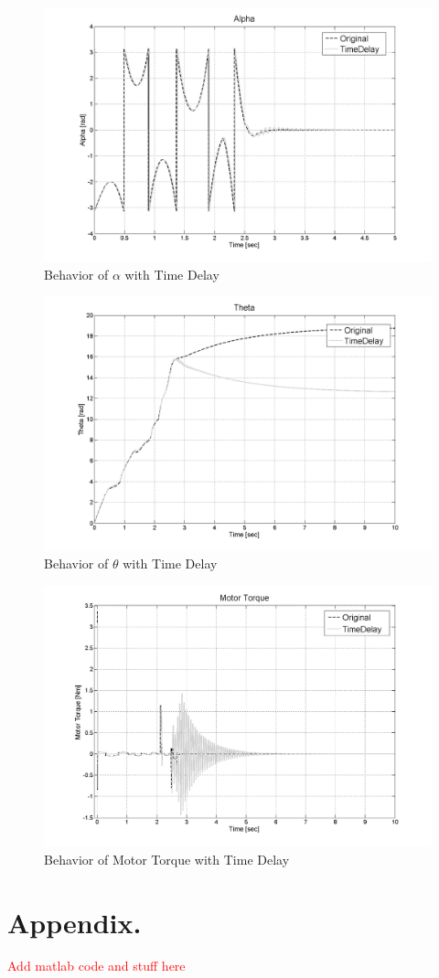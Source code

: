 \documentclass{article}
\newcommand{\xxx}[1]{\textcolor{red}{#1}}
\theoremstyle{plain}
\theoremstyle{definition}
\theoremstyle{remark}
\begin{document}
\begin{itemize}
\begin{figure}[h]
\includegraphics[width=1\textwidth]{q10_t1.png}
\caption{Behavior of $\alpha$ with Time Delay} \label{tex}
\label{fig:q10_t1}
\end{figure}
\begin{figure}[h]
\includegraphics[width=1\textwidth]{q10_t2.png}
\caption{Behavior of $\theta$ with Time Delay} \label{tex}
\label{fig:q10_t2}
\end{figure}
\begin{figure}[h]
\includegraphics[width=1\textwidth]{q10_t3.png}
\caption{Behavior of Motor Torque with Time Delay} \label{tex}
\label{fig:q10_t3}
\end{figure}
\end{itemize}

\clearpage
\section*{Appendix.}

\xxx{Add matlab code and stuff here}
\end{document}
